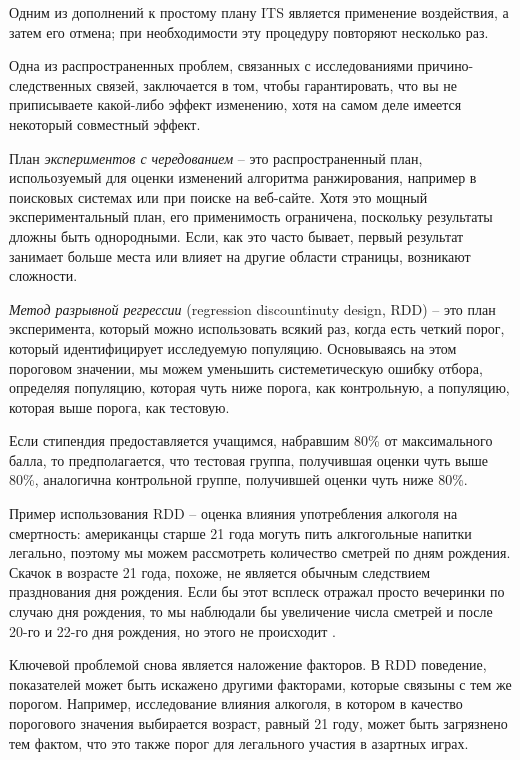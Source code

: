 \documentclass[%
	11pt,
	a4paper,
	utf8,
		]{article}
\begin{document}
Одним из дополнений к простому плану ITS является применение воздействия, а затем его отмена; при необходимости эту процедуру повторяют несколько раз.

Одна из распространенных проблем, связанных с исследованиями причино-следственных связей, заключается в том, чтобы гарантировать, что вы не приписываете какой-либо эффект изменению, хотя на самом деле имеется некоторый совместный эффект. 

План \emph{экспериментов с чередованием} -- это распространенный план, испольозуемый для оценки изменений алгоритма ранжирования, например в поисковых системах или при поиске на веб-сайте. Хотя это мощный экспериментальный план, его применимость ограничена, поскольку результаты дложны быть однородными. Если, как это часто бывает, первый результат занимает больше места  или влияет на другие области страницы, возникают сложности.

\emph{Метод разрывной регрессии} (regression discountinuty design, RDD) -- это план эксперимента, который можно использовать всякий раз, когда есть четкий порог, который идентифицирует исследуемую популяцию. Основываясь на этом пороговом значении, мы можем уменьшить системетическую ошибку отбора, определяя популяцию, которая чуть ниже порога, как контрольную, а популяцию, которая выше порога, как тестовую.

Если стипендия предоставляется учащимся, набравшим 80\% от максимального балла, то предполагается, что тестовая группа, получившая оценки чуть выше 80\%, аналогична контрольной группе, получившей оценки чуть ниже 80\%.

Пример использования RDD -- оценка влияния употребления алкоголя на смертность: американцы старше 21 года могуть пить алкгогольные напитки легально, поэтому мы можем рассмотреть количество сметрей по дням рождения. Скачок в возрасте 21 года, похоже, не является обычным следствием празднования дня рождения. Если бы этот всплеск отражал просто вечеринки по случаю дня рождения, то мы наблюдали бы увеличение числа сметрей и после 20-го и 22-го дня рождения, но этого не происходит \cite[]{kohavi:ab-tests-2021}.

Ключевой проблемой снова является наложение факторов. В RDD поведение, показателей может быть искажено другими факторами, которые связыны с тем же порогом. Например, исследование влияния алкоголя, в котором в качество порогового значения выбирается возраст, равный 21 году, может быть загрязнено тем фактом, что это также порог для легального участия в азартных играх.
\end{document}
